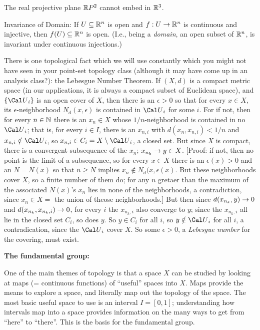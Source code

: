 The real projective plane ${\Bbb R} P^2$ cannot embed in ${\Bbb R}^3$.

\ssk

Invariance of Domain: If $U\subseteq {\Bbb R}^n$ is open and $f:U\rightarrow{\Bbb R}^n$ is continuous
and injective, then $f(U)\subseteq {\Bbb R}^n$ is open. (I.e., being a {\it domain}, an open 
subset of ${\Bbb R}^n$, is invariant under continuous injections.)

\bsk

There is one topological fact which we will use constantly which you might not have
seen in your point-set topology class (although it may have come up in an analysis
class?): the Lebesgue Number Theorem. If $(X,d)$ is a compact metric space
(in our applications, it is always a compact subset of Euclidean space), and 
$\{{\Cal U}_i\}$ is an open cover of $X$, then there is an $\epsilon>0$ so that
for every $x\in X$, its $\epsilon$-neighborhood $N_d(x,\epsilon)$ is contained
in ${\Cal U}_i$ for some $i$. 
For if not, then for every $n\in{\Bbb N}$ there is an $x_n\in X$ 
whose $1/n$-neighborhood is contained in no ${\Cal U}_i$; that is, for 
every $i\in I$, there is an $x_{n,i}$ with
$d(x_n,x_{n,i})<1/n$ and $x_{n,i}\notin{\Cal U}_i$, so $x_{n,i}\in C_i=X\setminus {\Cal U}_i$, 
a closed set. 
But since $X$ is compact, there is a convergent subsequence of the $x_n$; $x_{n_k}\rightarrow y\in X$.
[Proof: if not, then no point is the limit of a subsequence, so for every $x\in X$ there is
an $\epsilon(x)>0$ and an $N=N(x)$ so that $n\geq N$ implies $x_n\notin N_d(x,\epsilon(x)$.
But these neighborhoods cover $X$, so a finite number of them do; for any $n$ gretaer than
the maximum of the associated $N(x)$'s $x_n$ lies in none of the neighborhoods, a contradiction,
since $x_n\in X=$ the union of theose neighborhoods.]
But then since $d(x_{n_k},y)\rightarrow 0$ and $d(x_{n_k},x_{n_k,i})\rightarrow 0$, for every $i$
the $x_{n_k,i}$ also converge to $y$; since the $x_{n_k,i}$ all lie in the closed
set $C_i$, so does $y$. So $y\in C_i$ for all $i$, so $y\notin {\Cal U}_i$ for all $i$,
a contradication, since the ${\Cal U}_i$ cover $X$. So some $\epsilon>0$, a 
{\it Lebesgue number} for the covering, must exist.




\vfill
\eject

{\bf The fundamental group:}

\msk

One of the main themes of topology is that a space $X$ can be studied
by looking at maps (= continuous functions) of ``useful''
spaces into $X$. Maps provide the means to explore a space,
and literally map out the topology of the space. The most basic 
useful space to use is an interval $I=[0,1]$; understanding how intervals
map into a space provides information on the many ways to get
from ``here'' to ``there''. This is the basis for the fundamental
group.

